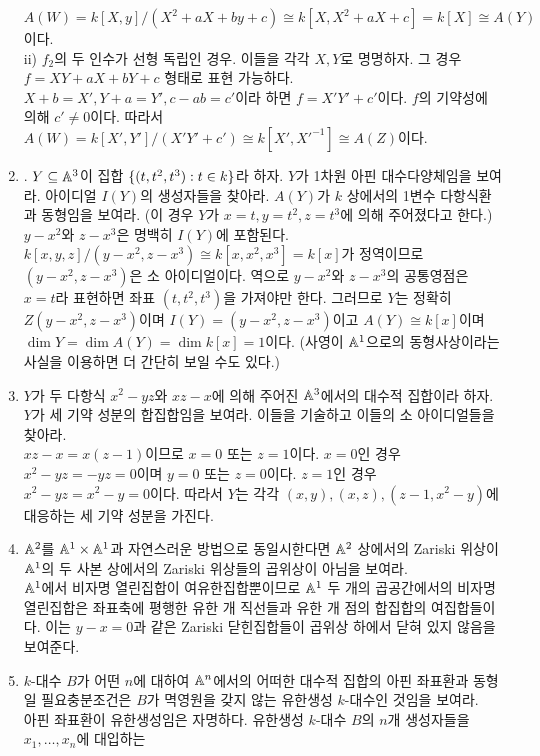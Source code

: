 \begin{enumerate}[label=\tb{1.\arabic*.},itemindent=0mm,itemsep=4mm]
	$A(W)=k[X,y]/(X^2+aX+by+c)\cong k[X,X^2+aX+c]=k[X]\cong A(Y)$이다.\\
	ii) $f_2$의 두 인수가 선형 독립인 경우. 이들을 각각 $X,Y$로 명명하자. 그 경우 $f=XY+aX+bY+c$ 형태로 표현 가능하다.
	$X+b=X',Y+a=Y',c-ab=c'$이라 하면 $f=X'Y'+c'$이다. $f$의 기약성에 의해 $c'\ne 0$이다.
	따라서 $A(W)=k[X',Y']/(X'Y'+c')\cong k[X',X'^{-1}]\cong A(Z)$이다.
	\item {}. $Y\subseteq\mathbb{A}^3$이 집합 $\{(t,t^2,t^3):t\in k\}$라 하자.
	$Y$가 1차원 아핀 대수다양체임을 보여라. 아이디얼 $I(Y)$의 생성자들을 찾아라.
	$A(Y)$가 $k$ 상에서의 1변수 다항식환과 동형임을 보여라.
	(이 경우 $Y$가  $x=t,y=t^2,z=t^3$에 의해 주어졌다고 한다.)\\
	\sol $y-x^2$와 $z-x^3$은 명백히 $I(Y)$에 포함된다.
	$k[x,y,z]/(y-x^2,z-x^3)\cong k[x,x^2,x^3]=k[x]$가 정역이므로 $(y-x^2,z-x^3)$은 소 아이디얼이다.
	역으로 $y-x^2$와 $z-x^3$의 공통영점은 $x=t$라 표현하면 좌표 $(t,t^2,t^3)$을 가져야만 한다.
	그러므로 $Y$는 정확히 $Z(y-x^2,z-x^3)$이며 $I(Y)=(y-x^2,z-x^3)$이고
	$A(Y)\cong k[x]$이며 $\dim Y=\dim A(Y)=\dim k[x]=1$이다.
	(사영이 $\mathbb{A}^1$으로의 동형사상이라는 사실을 이용하면 더 간단히 보일 수도 있다.)
	\item $Y$가 두 다항식 $x^2-yz$와 $xz-x$에 의해 주어진 $\mathbb{A}^3$에서의 대수적 집합이라 하자.
	$Y$가 세 기약 성분의 합집합임을 보여라. 이들을 기술하고 이들의 소 아이디얼들을 찾아라.\\
	\sol $xz-x=x(z-1)$이므로 $x=0$ 또는 $z=1$이다. $x=0$인 경우 $x^2-yz=-yz=0$이며 $y=0$ 또는 $z=0$이다.
	$z=1$인 경우 $x^2-yz=x^2-y=0$이다. 따라서 $Y$는 각각 $(x,y),(x,z),(z-1,x^2-y)$에 대응하는 세 기약 성분을 가진다.
	\item $\mathbb{A}^2$를 $\mathbb{A}^1\times\mathbb{A}^1$과 자연스러운 방법으로 동일시한다면
	$\mathbb{A}^2$ 상에서의 Zariski 위상이 $\mathbb{A}^1$의 두 사본 상에서의 Zariski 위상들의 곱위상이 아님을 보여라.\\
	\sol $\mathbb{A}^1$에서 비자명 열린집합이 여유한집합뿐이므로 $\mathbb{A}^1$ 두 개의 곱공간에서의
	비자명 열린집합은 좌표축에 평행한 유한 개 직선들과 유한 개 점의 합집합의 여집합들이다.
	이는 $y-x=0$과 같은 Zariski 닫힌집합들이 곱위상 하에서 닫혀 있지 않음을 보여준다.
	\item $k$-대수 $B$가 어떤 $n$에 대하여 $\mathbb{A}^n$에서의 어떠한 대수적 집합의 아핀 좌표환과 동형일 필요충분조건은
	$B$가 멱영원을 갖지 않는 유한생성 $k$-대수인 것임을 보여라.\\
	\sol 아핀 좌표환이 유한생성임은 자명하다. 유한생성 $k$-대수 $B$의 $n$개 생성자들을 $x_1,\ldots,x_n$에 대입하는

\end{enumerate}
